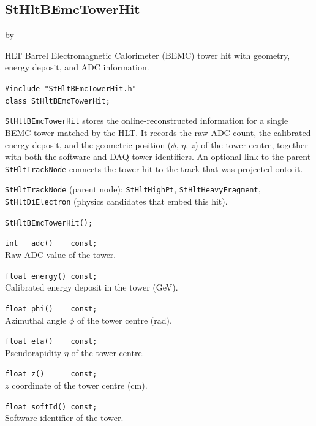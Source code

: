 \documentclass[twoside]{article}
\newcommand{\entrylabel}[1]{\mbox{\textbf{{#1}}}\hfil}%
\newenvironment{entry}
{\begin{list}{}%
    {\renewcommand{\makelabel}{\entrylabel}%
     \setlength{\labelwidth}{90pt}%
     \setlength{\leftmargin}{\labelwidth}
     \advance\leftmargin by \labelsep%
      }%
    }%
  {\end{list}}
\newcommand{\Entrylabel}[1]%
{\raisebox{0pt}[1ex][0pt]{\makebox[\labelwidth][l]%
    {\parbox[t]{\labelwidth}{\hspace{0pt}\textbf{{#1}}}}}}
\newenvironment{Entry}%
{\renewcommand{\entrylabel}{\Entrylabel}\begin{entry}}%
  {\end{entry}}
\begin{document}
\subsection{StHltBEmcTowerHit}
\label{sec:StHltBEmcTowerHit}
\begin{Entry}
\item[Summary] HLT Barrel Electromagnetic Calorimeter (BEMC) tower hit
    with geometry, energy deposit, and ADC information.
\item[Synopsis]
    \verb+#include "StHltBEmcTowerHit.h"+\\
    \verb+class StHltBEmcTowerHit;+\\
\item[Description]
    \texttt{StHltBEmcTowerHit} stores the online-reconstructed
    information for a single BEMC tower matched by the HLT.  It
    records the raw ADC count, the calibrated energy deposit, and the
    geometric position ($\phi$, $\eta$, $z$) of the tower centre,
    together with both the software and DAQ tower identifiers.  An
    optional link to the parent \texttt{StHltTrackNode} connects the
    tower hit to the track that was projected onto it.
\item[Related Classes]
    \texttt{StHltTrackNode} (parent node);
    \texttt{StHltHighPt}, \texttt{StHltHeavyFragment},
    \texttt{StHltDiElectron} (physics candidates that embed this hit).
\item[Public\\ Constructors]
    \verb+StHltBEmcTowerHit();+\\
\item[Public Member\\ Functions]
    \verb+int   adc()    const;+\\
    Raw ADC value of the tower.

    \verb+float energy() const;+\\
    Calibrated energy deposit in the tower (GeV).

    \verb+float phi()    const;+\\
    Azimuthal angle $\phi$ of the tower centre (rad).

    \verb+float eta()    const;+\\
    Pseudorapidity $\eta$ of the tower centre.

    \verb+float z()      const;+\\
    $z$ coordinate of the tower centre (cm).

    \verb+float softId() const;+\\
    Software identifier of the tower.


\end{Entry}
\end{document}
